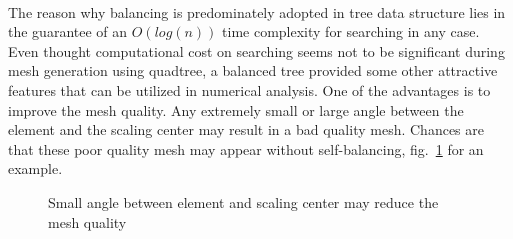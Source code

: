 \paragraph{}
The reason why balancing is predominately adopted in tree data structure lies in the guarantee of an $O\left(log(n)\right)$ time complexity for searching in any case.
Even thought computational cost on searching seems not to be significant during mesh generation using quadtree, a balanced tree provided some other attractive features that can be utilized in numerical analysis.
One of the advantages is to improve the mesh quality.
Any extremely small or large angle between the element and the scaling center may result in a bad quality mesh.
Chances are that these poor quality mesh may appear without self-balancing, fig.~\ref{qdt_fig:sbfem_adv_1} for an example.
    \begin{figure}[!ht]
        \centering
        \caption{Small angle between element and scaling center may reduce the mesh quality}
        \label{qdt_fig:sbfem_adv_1}
    \end{figure}

